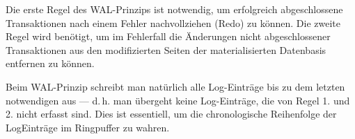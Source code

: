 \documentclass{lehramt-informatik-haupt}
\begin{document}
Die erste Regel des WAL-Prinzips ist notwendig, um erfolgreich
abgeschlossene Transaktionen nach einem Fehler nachvollziehen (Redo) zu
können. Die zweite Regel wird benötigt, um im Fehlerfall die Änderungen
nicht abgeschlossener Transaktionen aus den modifizierten Seiten der
materialisierten Datenbasis entfernen zu können.

Beim WAL-Prinzip schreibt man natürlich alle Log-Einträge bis zu dem
letzten notwendigen aus — d.\,h. man übergeht keine Log-Einträge, die von
Regel 1. und 2. nicht erfasst sind. Dies ist essentiell, um die
chronologische Reihenfolge der LogEinträge im Ringpuffer zu wahren.

\literatur
\end{document}
